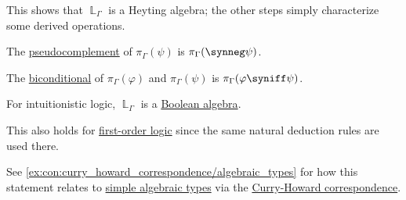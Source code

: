 \begin{proposition}
\begin{thmenum}
\begin{thmenum}
      This shows that \( \BbbL_\Gamma \) is a Heyting algebra; the other steps simply characterize some derived operations.

       The \hyperref[eq:def:heyting_algebra/pseudocomplement]{pseudocomplement} of \( \pi_\Gamma(\psi) \) is \( \pi_\Gamma(\synneg \psi) \).

       The \hyperref[def:heyting_algebra/biconditional]{biconditional} of \( \pi_\Gamma(\varphi) \) and \( \pi_\Gamma(\psi) \) is \( \pi_\Gamma(\varphi \syniff \psi) \).
    \end{thmenum}

     For intuitionistic logic, \( \BbbL_\Gamma \) is a \hyperref[def:boolean_algebra]{Boolean algebra}.
  \end{thmenum}
\end{proposition}
\begin{comments}
  \item This also holds for \hyperref[sec:first_order_logic]{first-order logic} since the same natural deduction rules are used there.
  \item See \cref{ex:con:curry_howard_correspondence/algebraic_types} for how this statement relates to \hyperref[def:simple_algebraic_types]{simple algebraic types} via the \hyperref[con:curry_howard_correspondence]{Curry-Howard correspondence}.
\end{comments}
